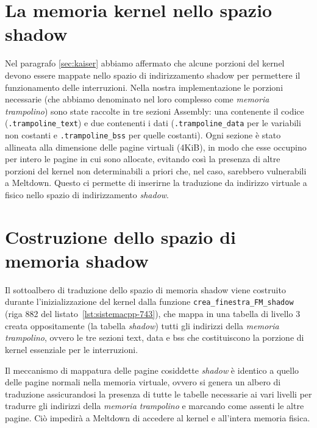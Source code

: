 \section{La memoria kernel nello spazio shadow}
Nel paragrafo \vref{sec:kaiser} abbiamo affermato che alcune porzioni del kernel devono essere mappate nello spazio di indirizzamento shadow per permettere il funzionamento delle interruzioni.
Nella nostra implementazione le porzioni necessarie (che abbiamo denominato nel loro complesso come \emph{memoria trampolino}) sono state raccolte in tre sezioni Assembly: una contenente il codice (\texttt{.trampoline\_text}) e due contenenti i dati (\texttt{.trampoline\_data} per le variabili non costanti e \texttt{.trampoline\_bss} per quelle costanti).
Ogni sezione è stato allineata alla dimensione delle pagine virtuali (4KiB), in modo che esse occupino per intero le pagine in cui sono allocate, evitando così la presenza di altre porzioni del kernel non determinabili a priori che, nel caso, sarebbero vulnerabili a Meltdown.
Questo ci permette di inserirne la traduzione da indirizzo virtuale a fisico nello spazio di indirizzamento \emph{shadow}.

\section{Costruzione dello spazio di memoria shadow}
\label{sec:memoria-shadow}
Il sottoalbero di traduzione dello spazio di memoria shadow viene costruito durante l'inizializzazione del kernel dalla funzione \texttt{crea\_finestra\_FM\_shadow} (riga 882 del listato~\vref{lst:sistemacpp-743}), che mappa in una tabella di livello 3 creata oppositamente (la tabella \emph{shadow}) tutti gli indirizzi della \emph{memoria trampolino}, ovvero le tre sezioni text, data e bss che costituiscono la porzione di kernel essenziale per le interruzioni.

Il meccanismo di mappatura delle pagine cosiddette \emph{shadow} è identico a quello delle pagine normali nella memoria virtuale, ovvero si genera un albero di traduzione assicurandosi la presenza di tutte le tabelle necessarie ai vari livelli per tradurre gli indirizzi della \emph{memoria trampolino} e marcando come assenti le altre pagine.
Ciò impedirà a Meltdown di accedere al kernel e all'intera memoria fisica.

